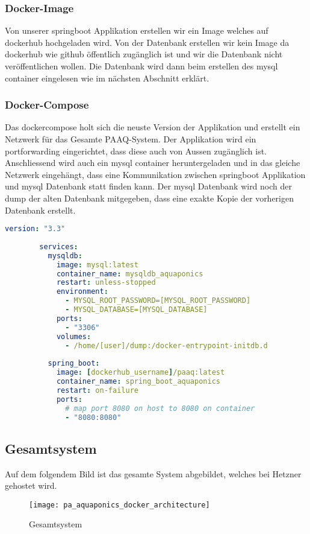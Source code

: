 \documentclass[../main.tex]{subfiles}
\begin{document}
	\subsubsection{Docker-Image}
	Von unserer \gls{springboot} Applikation erstellen wir ein Image welches auf \gls{dockerhub} hochgeladen wird. Von der Datenbank erstellen wir kein Image da \gls{dockerhub} wie \gls{github} öffentlich zugänglich ist und wir die Datenbank nicht veröffentlichen wollen. Die Datenbank wird dann beim erstellen des \gls{mysql} \gls{container} eingelesen wie im nächsten Abschnitt erklärt.
	
	\subsubsection{Docker-Compose}
	Das \gls{dockercompose} holt sich die neuste Version der Applikation und erstellt ein Netzwerk für das Gesamte PAAQ-System. Der Applikation wird ein \gls{portforwarding} eingerichtet, dass diese auch von Aussen zugänglich ist. Anschliessend wird auch ein \gls{mysql} \gls{container} heruntergeladen und in das gleiche Netzwerk eingehängt, dass eine Kommunikation zwischen \gls{springboot} Applikation und \gls{mysql} Datenbank statt finden kann. Der \gls{mysql} Datenbank wird noch der \gls{dump} der alten Datenbank mitgegeben, dass eine exakte Kopie der vorherigen Datenbank erstellt.
	\begin{lstlisting}[language=yaml]
		version: "3.3"
		
		services:
		  mysqldb:
		    image: mysql:latest
		    container_name: mysqldb_aquaponics
		    restart: unless-stopped
		    environment:
		      - MYSQL_ROOT_PASSWORD=[MYSQL_ROOT_PASSWORD]
		      - MYSQL_DATABASE=[MYSQL_DATABASE]
		    ports:
		      - "3306"
		    volumes:
		      - /home/[user]/dump:/docker-entrypoint-initdb.d
		      
		  spring_boot:
		    image: [dockerhub_username]/paaq:latest
		    container_name: spring_boot_aquaponics
		    restart: on-failure
		    ports:
		      # map port 8080 on host to 8080 on container
		      - "8080:8080"
	\end{lstlisting}

	\subsection{Gesamtsystem}
	Auf dem folgendem Bild ist das gesamte System abgebildet, welches bei Hetzner gehostet wird.
	\begin{figure}[H]
		\centering
		\texttt{[image: pa\_aquaponics\_docker\_architecture]}
		\caption{Gesamtsystem}
		\label{fig:Gesamtsystem}
	\end{figure}
	
\end{document}
